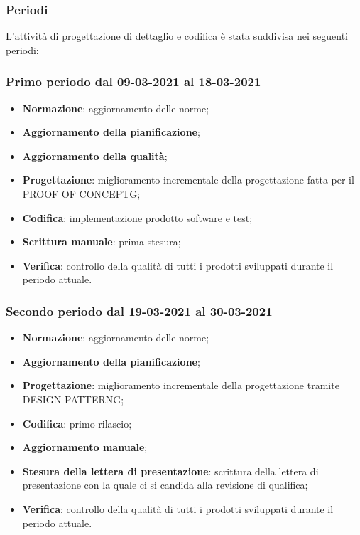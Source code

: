 	\subsubsection{Periodi}
	L’attività di progettazione di dettaglio e codifica è stata suddivisa nei seguenti periodi:
	\subsubsection{Primo periodo dal 09-03-2021 al 18-03-2021}
	\begin{itemize}
		\item \textbf{Normazione}: aggiornamento delle norme;
		\item \textbf{Aggiornamento della pianificazione};
		\item \textbf{Aggiornamento della qualità};
		\item \textbf{Progettazione}: miglioramento incrementale della progettazione fatta per il PROOF OF CONCEPTG;
		\item \textbf{Codifica}: implementazione prodotto software e test;
		\item \textbf{Scrittura manuale}: prima stesura;
		\item \textbf{Verifica}: controllo della qualità di tutti i prodotti sviluppati durante il periodo attuale.
	\end{itemize}

	\subsubsection{Secondo periodo dal 19-03-2021 al 30-03-2021}
	\begin{itemize}
	\item \textbf{Normazione}: aggiornamento delle norme;
	\item \textbf{Aggiornamento della pianificazione};
	\item \textbf{Progettazione}: miglioramento incrementale della progettazione tramite DESIGN PATTERNG;
	\item \textbf{Codifica}: primo rilascio;
	\item \textbf{Aggiornamento manuale};
	\item \textbf{Stesura della lettera di presentazione}: scrittura della lettera di presentazione con la quale ci
	si candida alla revisione di qualifica;
	\item \textbf{Verifica}: controllo della qualità di tutti i prodotti sviluppati durante il periodo attuale.
	\end{itemize}

